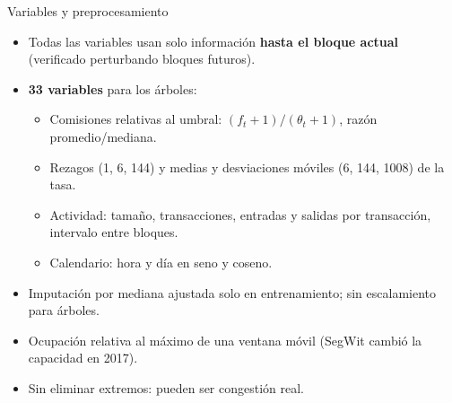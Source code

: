 \documentclass[aspectratio=169,11pt]{beamer}
\begin{document}
\begin{frame}{Variables y preprocesamiento}
\begin{itemize}
\item Todas las variables usan solo información \textbf{hasta el bloque actual} (verificado perturbando bloques futuros).
\item \textbf{33 variables} para los árboles:
\begin{itemize}
\item Comisiones relativas al umbral: $(f_t+1)/(\theta_t+1)$, razón promedio/mediana.
\item Rezagos (1, 6, 144) y medias y desviaciones móviles (6, 144, 1008) de la tasa.
\item Actividad: tamaño, transacciones, entradas y salidas por transacción, intervalo entre bloques.
\item Calendario: hora y día en seno y coseno.
\end{itemize}
\item Imputación por mediana ajustada solo en entrenamiento; sin escalamiento para árboles.
\item Ocupación relativa al máximo de una ventana móvil (SegWit cambió la capacidad en 2017).
\item Sin eliminar extremos: pueden ser congestión real.
\end{itemize}
\end{frame}
\end{document}
